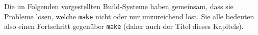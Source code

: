 Die im Folgenden vorgestellten Build-Systeme haben gemeinsam, dass sie Probleme
lösen, welche \texttt{make} nicht oder nur unzureichend löst. Sie alle bedeuten
also einen Fortschritt gegenüber \texttt{make} (daher auch der Titel dieses
Kapitels).
